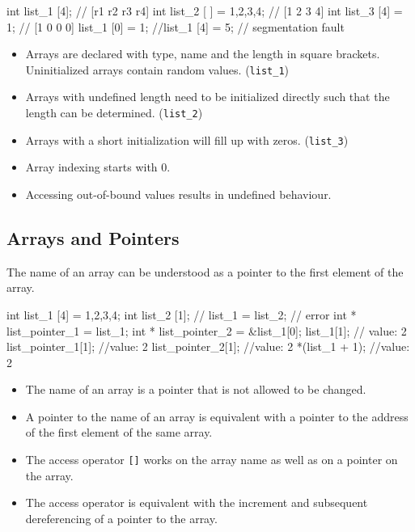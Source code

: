 \documentclass[10pt,a4paper]{scrartcl}
\begin{document}
\begin{multicols*}{2}
\begin{TPCpp}
int list_1 [4]; // [r1 r2 r3 r4]
int list_2 [ ] = {1,2,3,4}; // [1 2 3 4]
int list_3 [4] = {1}; // [1 0 0 0]
list_1 [0] = 1;
//list_1 [4] = 5; // segmentation fault
\end{TPCpp}

\begin{itemize}
\item Arrays are declared with type, name and the length in square brackets. Uninitialized arrays contain random values. (\verb+list_1+)
\item Arrays with undefined length need to be initialized directly such that the length can be determined. (\verb+list_2+)
\item Arrays with a short initialization will fill up with zeros. (\verb+list_3+)
\item Array indexing starts with 0.
\item Accessing out-of-bound values results in undefined behaviour.
\end{itemize}

\subsection{Arrays and Pointers}
\label{sec:ArraysAndPointers}

The name of an array can be understood as a pointer to the first element of the array.

\begin{TPCpp}
int list_1 [4] = {1,2,3,4};
int list_2 [1];
// list_1 = list_2; // error
int * list_pointer_1 = list_1;
int * list_pointer_2 = &list_1[0];
list_1[1]; // value: 2
list_pointer_1[1]; //value: 2
list_pointer_2[1]; //value: 2
*(list_1 + 1); //value: 2
\end{TPCpp}

\begin{itemize}
\item The name of an array is a pointer that is not allowed to be changed.
\item A pointer to the name of an array is equivalent with a pointer to the address of the first element of the same array.
\item The access operator \verb+[]+ works on the array name as well as on a pointer on the array.
\item The access operator is equivalent with the increment and subsequent dereferencing of a pointer to the array.
\end{itemize}


\end{multicols*}
\end{document}
